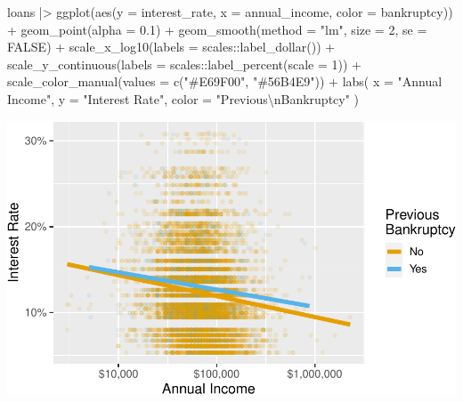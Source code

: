 \documentclass[12pt]{article}
\newenvironment{Shaded}{\begin{snugshade}}{\end{snugshade}}
\newcommand{\AttributeTok}[1]{\textcolor[rgb]{0.77,0.63,0.00}{#1}}
\newcommand{\ConstantTok}[1]{\textcolor[rgb]{0.00,0.00,0.00}{#1}}
\newcommand{\DecValTok}[1]{\textcolor[rgb]{0.00,0.00,0.81}{#1}}
\newcommand{\FloatTok}[1]{\textcolor[rgb]{0.00,0.00,0.81}{#1}}
\newcommand{\FunctionTok}[1]{\textcolor[rgb]{0.00,0.00,0.00}{#1}}
\newcommand{\NormalTok}[1]{#1}
\newcommand{\SpecialCharTok}[1]{\textcolor[rgb]{0.00,0.00,0.00}{#1}}
\newcommand{\StringTok}[1]{\textcolor[rgb]{0.31,0.60,0.02}{#1}}
\begin{document}
\begin{Shaded}
\begin{Highlighting}[]
\NormalTok{loans }\SpecialCharTok{|\textgreater{}}
  \FunctionTok{ggplot}\NormalTok{(}\FunctionTok{aes}\NormalTok{(}\AttributeTok{y =}\NormalTok{ interest\_rate, }\AttributeTok{x =}\NormalTok{ annual\_income, }\AttributeTok{color =}\NormalTok{ bankruptcy)) }\SpecialCharTok{+}
  \FunctionTok{geom\_point}\NormalTok{(}\AttributeTok{alpha =} \FloatTok{0.1}\NormalTok{) }\SpecialCharTok{+} 
  \FunctionTok{geom\_smooth}\NormalTok{(}\AttributeTok{method =} \StringTok{"lm"}\NormalTok{, }\AttributeTok{size =} \DecValTok{2}\NormalTok{, }\AttributeTok{se =} \ConstantTok{FALSE}\NormalTok{) }\SpecialCharTok{+} 
  \FunctionTok{scale\_x\_log10}\NormalTok{(}\AttributeTok{labels =}\NormalTok{ scales}\SpecialCharTok{::}\FunctionTok{label\_dollar}\NormalTok{()) }\SpecialCharTok{+}
  \FunctionTok{scale\_y\_continuous}\NormalTok{(}\AttributeTok{labels =}\NormalTok{ scales}\SpecialCharTok{::}\FunctionTok{label\_percent}\NormalTok{(}\AttributeTok{scale =} \DecValTok{1}\NormalTok{)) }\SpecialCharTok{+}
  \FunctionTok{scale\_color\_manual}\NormalTok{(}\AttributeTok{values =} \FunctionTok{c}\NormalTok{(}\StringTok{"\#E69F00"}\NormalTok{, }\StringTok{"\#56B4E9"}\NormalTok{)) }\SpecialCharTok{+}
  \FunctionTok{labs}\NormalTok{(}
    \AttributeTok{x =} \StringTok{"Annual Income"}\NormalTok{, }
    \AttributeTok{y =} \StringTok{"Interest Rate"}\NormalTok{, }
    \AttributeTok{color =} \StringTok{"Previous}\SpecialCharTok{\textbackslash{}n}\StringTok{Bankruptcy"}
\NormalTok{    )}
\end{Highlighting}
\end{Shaded}

\begin{center}\includegraphics[width=0.8\linewidth]{educators-perspective-tidyverse_files/figure-latex/ggplot-scat-1} \end{center}
\end{document}
